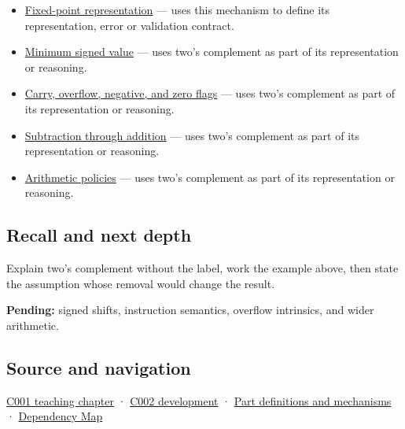 \begin{itemize}
\item
  \hyperref[appendix-1d0dbe8924cc]{Fixed-point representation} --- uses this mechanism to define its representation, error or validation contract.
\item
  \hyperref[appendix-05f39b10364d]{Minimum signed value} --- uses two's complement as part of its representation or reasoning.
\item
  \hyperref[appendix-8d687c9c08ab]{Carry, overflow, negative, and zero flags} --- uses two's complement as part of its representation or reasoning.
\item
  \hyperref[appendix-1c7df340573e]{Subtraction through addition} --- uses two's complement as part of its representation or reasoning.
\item
  \hyperref[appendix-2ed044358b82]{Arithmetic policies} --- uses two's complement as part of its representation or reasoning.
\end{itemize}

\subsection{Recall and next depth}\label{appendix-4fbc03d20829-recall-and-next-depth}

Explain two's complement without the label, work the example above, then state the assumption whose removal would change the result.

\textbf{Pending:} signed shifts, instruction semantics, overflow intrinsics, and wider arithmetic.

\subsection{Source and navigation}\label{appendix-4fbc03d20829-source-and-navigation}

\hyperref[01-foundations-i-ch001-from-a-signal-to-an-interpretation]{C001 teaching chapter} · \hyperref[01-foundations-i-ch001-arithmetic-becomes-a-policy]{C002 development} · \hyperref[appendix-fd090d982a15]{Part definitions and mechanisms} · \hyperref[appendix-4ad47bdd269a]{Dependency Map}
